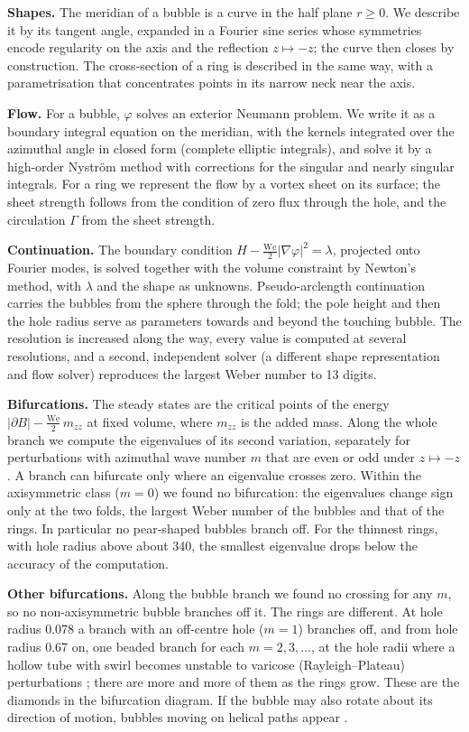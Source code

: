 \documentclass[11pt]{article}
\begin{document}
\textbf{Shapes.} The meridian of a bubble is a curve in the half plane \(r \ge 0\). We describe it by its tangent angle, expanded in a Fourier sine series whose symmetries encode regularity on the axis and the reflection \(z \mapsto -z\); the curve then closes by construction. The cross-section of a ring is described in the same way, with a parametrisation that concentrates points in its narrow neck near the axis.

\textbf{Flow.} For a bubble, \(\varphi\) solves an exterior Neumann problem. We write it as a boundary integral equation on the meridian, with the kernels integrated over the azimuthal angle in closed form (complete elliptic integrals), and solve it by a high-order Nyström method with corrections for the singular and nearly singular integrals. For a ring we represent the flow by a vortex sheet on its surface; the sheet strength follows from the condition of zero flux through the hole, and the circulation \(\Gamma\) from the sheet strength.

\textbf{Continuation.} The boundary condition \(H - \tfrac{\mathrm{We}}{2}|\nabla\varphi|^2 = \lambda\), projected onto Fourier modes, is solved together with the volume constraint by Newton's method, with \(\lambda\) and the shape as unknowns. Pseudo-arclength continuation carries the bubbles from the sphere through the fold; the pole height and then the hole radius serve as parameters towards and beyond the touching bubble. The resolution is increased along the way, every value is computed at several resolutions, and a second, independent solver (a different shape representation and flow solver) reproduces the largest Weber number to 13 digits.

\textbf{Bifurcations.} The steady states are the critical points of the energy \(|\partial B| - \tfrac{\mathrm{We}}{2}\, m_{zz}\) at fixed volume, where \(m_{zz}\) is the added mass. Along the whole branch we compute the eigenvalues of its second variation, separately for perturbations with azimuthal wave number \(m\) that are even or odd under \(z \mapsto -z\). A branch can bifurcate only where an eigenvalue crosses zero. Within the axisymmetric class (\(m = 0\)) we found no bifurcation: the eigenvalues change sign only at the two folds, the largest Weber number of the bubbles and that of the rings. In particular no pear-shaped bubbles branch off. For the thinnest rings, with hole radius above about 340, the smallest eigenvalue drops below the accuracy of the computation.

\textbf{Other bifurcations.} Along the bubble branch we found no crossing for any \(m\), so no non-axisymmetric bubble branches off it. The rings are different. At hole radius 0.078 a branch with an off-centre hole (\(m = 1\)) branches off, and from hole radius 0.67 on, one beaded branch for each \(m = 2, 3, \dots\), at the hole radii where a hollow tube with swirl becomes unstable to varicose (Rayleigh--Plateau) perturbations \cite{ponstein}; there are more and more of them as the rings grow. These are the diamonds in the bifurcation diagram. If the bubble may also rotate about its direction of motion, bubbles moving on helical paths appear \cite{davinci}.
\end{document}

